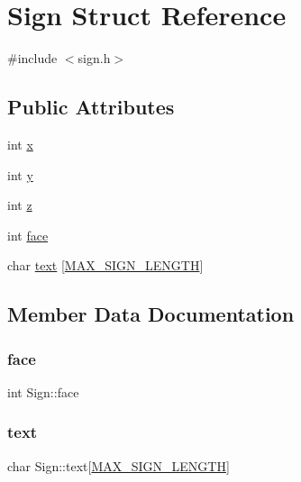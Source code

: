 \hypertarget{structSign}{}\section{Sign Struct Reference}
\label{structSign}


{\ttfamily \#include $<$sign.\+h$>$}

\subsection*{Public Attributes}
\begin{DoxyCompactItemize}
\item 
int \hyperlink{structSign_a9672fe58fa3a1d75c9511fe8259eb4e6}{x}
\item 
int \hyperlink{structSign_afdd7a7b76acc62dfd45965caed37c3f3}{y}
\item 
int \hyperlink{structSign_a5eb6412ecae2da81951ffdf073a994ed}{z}
\item 
int \hyperlink{structSign_a5a5f53a409cd7ec36733fc80e6d25785}{face}
\item 
char \hyperlink{structSign_aa3053ca28e2fecc26cfbef7797da4646}{text} \mbox{[}\hyperlink{sign_8h_a710dbda73a9300c41fa70abbc375b912}{M\+A\+X\+\_\+\+S\+I\+G\+N\+\_\+\+L\+E\+N\+G\+TH}\mbox{]}
\end{DoxyCompactItemize}


\subsection{Member Data Documentation}
\mbox{\label{structSign_a5a5f53a409cd7ec36733fc80e6d25785}} 
\subsubsection{\texorpdfstring{face}{face}}
{\footnotesize\ttfamily int Sign\+::face}

\mbox{\label{structSign_aa3053ca28e2fecc26cfbef7797da4646}} 
\subsubsection{\texorpdfstring{text}{text}}
{\footnotesize\ttfamily char Sign\+::text\mbox{[}\hyperlink{sign_8h_a710dbda73a9300c41fa70abbc375b912}{M\+A\+X\+\_\+\+S\+I\+G\+N\+\_\+\+L\+E\+N\+G\+TH}\mbox{]}}

